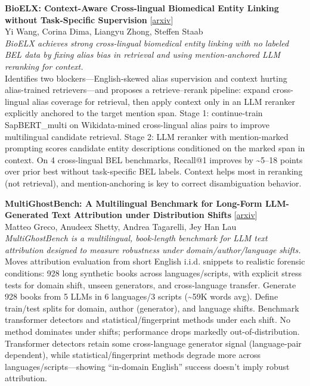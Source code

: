 \documentclass[12pt,letterpaper]{article}
\begin{document}
\medskip

{\small\textbf{BioELX: Context-Aware Cross-lingual Biomedical Entity Linking without Task-Specific Supervision}} {\scriptsize[\href{https://arxiv.org/abs/2605.27380}{arxiv}]}\\
{\scriptsize Yi Wang, Corina Dima, Liangyu Zhong, Steffen Staab}\\

{\small\textit{BioELX achieves strong cross-lingual biomedical entity linking with no labeled BEL data by fixing alias bias in retrieval and using mention-anchored LLM reranking for context.}}\\[1pt]
{\footnotesize Identifies two blockers---English-skewed alias supervision and context hurting alias-trained retrievers---and proposes a retrieve--rerank pipeline: expand cross-lingual alias coverage for retrieval, then apply context only in an LLM reranker explicitly anchored to the target mention span. Stage 1: continue-train SapBERT\_multi on Wikidata-mined cross-lingual alias pairs to improve multilingual candidate retrieval. Stage 2: LLM reranker with mention-marked prompting scores candidate entity descriptions conditioned on the marked span in context. On 4 cross-lingual BEL benchmarks, Recall@1 improves by \textasciitilde{}5--18 points over prior best without task-specific BEL labels. Context helps most in reranking (not retrieval), and mention-anchoring is key to correct disambiguation behavior.}

\medskip

{\small\textbf{MultiGhostBench: A Multilingual Benchmark for Long-Form LLM-Generated Text Attribution under Distribution Shifts}} {\scriptsize[\href{https://arxiv.org/abs/2609.02379}{arxiv}]}\\
{\scriptsize Matteo Greco, Anudeex Shetty, Andrea Tagarelli, Jey Han Lau}\\

{\small\textit{MultiGhostBench is a multilingual, book-length benchmark for LLM text attribution designed to measure robustness under domain/author/language shifts.}}\\[1pt]
{\footnotesize Moves attribution evaluation from short English i.i.d. snippets to realistic forensic conditions: 928 long synthetic books across languages/scripts, with explicit stress tests for domain shift, unseen generators, and cross-language transfer. Generate 928 books from 5 LLMs in 6 languages/3 scripts (\textasciitilde{}59K words avg). Define train/test splits for domain, author (generator), and language shifts. Benchmark transformer detectors and statistical/fingerprint methods under each shift. No method dominates under shifts; performance drops markedly out-of-distribution. Transformer detectors retain some cross-language generator signal (language-pair dependent), while statistical/fingerprint methods degrade more across languages/scripts---showing ``in-domain English'' success doesn't imply robust attribution.}
\end{document}
